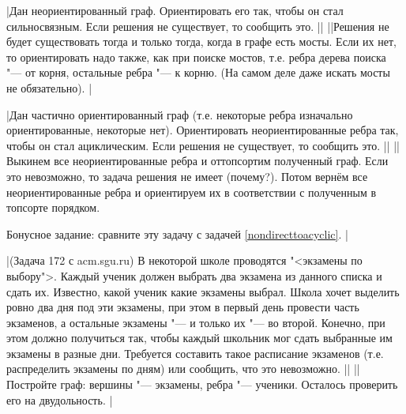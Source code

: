\task|Дан неориентированный граф. Ориентировать его так, чтобы он стал сильносвязным. 
Если решения не существует, то сообщить это.
||
||Решения не будет существовать тогда и только тогда, когда в графе есть мосты.
Если их нет, то ориентировать надо также, как при поиске мостов, т.е. ребра дерева поиска "--- от корня,
остальные ребра "--- к корню. (На самом деле даже искать мосты не обязательно).
|\label{nondirecttoSC}

\task|Дан частично ориентированный граф (т.е. некоторые ребра изначально ориентированные, 
некоторые нет). Ориентировать неориентированные ребра так, чтобы он стал ациклическим. Если решения не существует,
то сообщить это.
||
||Выкинем все неориентированные ребра и оттопсортим полученный граф. Если это невозможно,
то задача решения не имеет (почему?). Потом вернём все неориентированные ребра и ориентируем их в соответствии
с полученным в топсорте порядком.

Бонусное задание: сравните эту задачу с задачей \ref{nondirecttoacyclic}.
|\label{semidirecttoacyclic}

\task|(Задача 172 с acm.sgu.ru) В некоторой школе проводятся "<экзамены по выбору">. 
Каждый ученик должен выбрать два экзамена из данного списка и сдать их. Известно, какой ученик какие экзамены выбрал. 
Школа хочет выделить ровно два дня под эти экзамены, при этом в первый день провести часть 
экзаменов, а остальные экзамены "--- и только их "--- во второй. Конечно, при этом должно получиться так, 
чтобы каждый школьник мог сдать выбранные им экзамены в разные дни. Требуется составить такое 
расписание экзаменов (т.е. распределить экзамены по дням) или сообщить, что это невозможно.
||
||Постройте граф: вершины "--- экзамены, ребра "--- ученики. Осталось проверить его на 
двудольность.
|\label{eXam}
